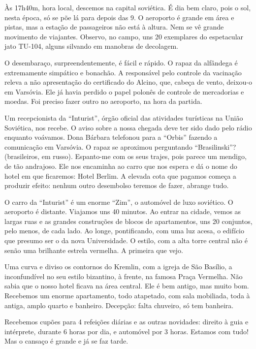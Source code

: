 Às 17h40m, hora local, descemos na capital soviética. É dia bem claro, pois o sol, nesta época, só se põe lá para depois das 9. O aeroporto é grande em área e pistas, mas a estação de passageiros não está à altura. Nem se vê grande movimento de viajantes. Observo, no campo, uns 20 exemplares do espetacular jato TU-104, alguns silvando em manobras de decolagem.

O desembaraço, surpreendentemente, é fácil e rápido. O rapaz da alfândega é extremamente simpático e bonachão. A responsável pelo controle da vacinação releva a não apresentação do certificado do Alcino, que, cabeça de vento, deixou-o em Varsóvia. Ele já havia perdido o papel polonês de controle de mercadorias e moedas. Foi preciso fazer outro no aeroporto, na hora da partida.

Um recepcionista da ``Inturist'', órgão oficial das atividades turísticas na União Soviética, nos recebe. O aviso sobre a nossa chegada deve ter sido dado pelo rádio enquanto voávamos. Dona Bárbara telefonou para a ``Orbis'' fazendo a comunicação em Varsóvia. O rapaz se aproximou perguntando ``Brasilinski''? (brasileiros, em russo). Espanto-me com os seus trajes, pois parece um mendigo, de tão andrajoso. Ele nos encaminha ao carro que nos espera e dá o nome do hotel em que ficaremos: Hotel Berlim. A elevada cota que pagamos começa a produzir efeito: nenhum outro desembolso teremos de fazer, abrange tudo.

O carro da ``Inturist'' é um enorme ``Zim'', o automóvel de luxo soviético. O aeroporto é distante. Viajamos uns 40 minutos. Ao entrar na cidade, vemos as largas ruas e as grandes construções de blocos de apartamentos, uns 20 conjuntos, pelo menos, de cada lado. Ao longe, pontificando, com uma luz acesa, o edifício que presumo ser o da nova Universidade. O estilo, com a alta torre central não é senão uma brilhante estrela vermelha. A primeira que vejo.

Uma curva e diviso os contornos do Kremlin, com a igreja de São Basílio, a inconfundível no seu estilo bizantino, à frente, na famosa Praça Vermelha. Não sabia que o nosso hotel ficava na área central. Ele é bem antigo, mas muito bom. Recebemos um enorme apartamento, todo atapetado, com sala mobiliada, toda à antiga, amplo quarto e banheiro. Decepção: falta chuveiro, só tem banheira.

Recebemos cupões para 4 refeições diárias e as outras novidades: direito à guia e intérprete, durante 6 horas por dia, e automóvel por 3 horas. Estamos com tudo! Mas o cansaço é grande e já se faz tarde.

